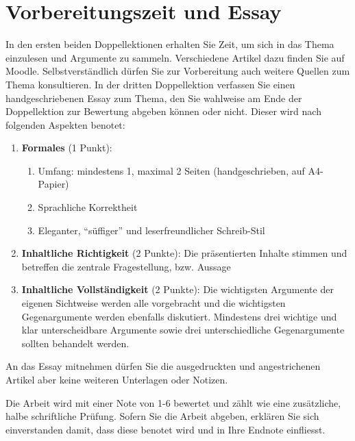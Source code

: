 \section{Vorbereitungszeit und Essay}

In den ersten beiden Doppellektionen erhalten Sie Zeit, um sich in das Thema einzulesen und Argumente zu sammeln. Verschiedene Artikel dazu finden Sie auf Moodle. Selbstverständlich dürfen Sie zur Vorbereitung auch weitere Quellen zum Thema konsultieren. In der dritten Doppellektion verfassen Sie einen handgeschriebenen Essay zum Thema, den Sie wahlweise am Ende der Doppellektion zur Bewertung abgeben können oder nicht. Dieser wird nach folgenden Aspekten benotet:

\begin{enumerate}
\item \textbf{Formales} (1 Punkt): 
\begin{enumerate}
\item Umfang: mindestens 1, maximal 2 Seiten (handgeschrieben, auf A4-Papier)
\item Sprachliche Korrektheit
\item Eleganter, \enquote{süffiger} und leserfreundlicher Schreib-Stil
\end{enumerate}
\item \textbf{Inhaltliche Richtigkeit} (2 Punkte): Die präsentierten Inhalte stimmen und betreffen die zentrale Fragestellung, bzw. Aussage
\item \textbf{Inhaltliche Vollständigkeit} (2 Punkte): Die wichtigsten Argumente der eigenen Sichtweise werden alle vorgebracht und die wichtigsten Gegenargumente werden ebenfalls diskutiert. Mindestens drei wichtige und klar unterscheidbare Argumente sowie drei unterschiedliche Gegenargumente sollten behandelt werden.
\end{enumerate}

An das Essay mitnehmen dürfen Sie die ausgedruckten und angestrichenen Artikel aber keine weiteren Unterlagen oder Notizen.

Die Arbeit wird mit einer Note von 1-6 bewertet und zählt wie eine zusätzliche, halbe schriftliche Prüfung. Sofern Sie die Arbeit abgeben, erklären Sie sich einverstanden damit, dass diese benotet wird und in Ihre Endnote einfliesst.
